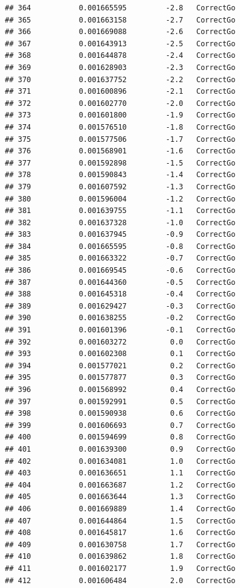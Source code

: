 \documentclass[
]{article}
\begin{document}
\begin{verbatim}
## 364           0.001665595         -2.8   CorrectGo
## 365           0.001663158         -2.7   CorrectGo
## 366           0.001669088         -2.6   CorrectGo
## 367           0.001643913         -2.5   CorrectGo
## 368           0.001644878         -2.4   CorrectGo
## 369           0.001628903         -2.3   CorrectGo
## 370           0.001637752         -2.2   CorrectGo
## 371           0.001600896         -2.1   CorrectGo
## 372           0.001602770         -2.0   CorrectGo
## 373           0.001601800         -1.9   CorrectGo
## 374           0.001576510         -1.8   CorrectGo
## 375           0.001577506         -1.7   CorrectGo
## 376           0.001568901         -1.6   CorrectGo
## 377           0.001592898         -1.5   CorrectGo
## 378           0.001590843         -1.4   CorrectGo
## 379           0.001607592         -1.3   CorrectGo
## 380           0.001596004         -1.2   CorrectGo
## 381           0.001639755         -1.1   CorrectGo
## 382           0.001637328         -1.0   CorrectGo
## 383           0.001637945         -0.9   CorrectGo
## 384           0.001665595         -0.8   CorrectGo
## 385           0.001663322         -0.7   CorrectGo
## 386           0.001669545         -0.6   CorrectGo
## 387           0.001644360         -0.5   CorrectGo
## 388           0.001645318         -0.4   CorrectGo
## 389           0.001629427         -0.3   CorrectGo
## 390           0.001638255         -0.2   CorrectGo
## 391           0.001601396         -0.1   CorrectGo
## 392           0.001603272          0.0   CorrectGo
## 393           0.001602308          0.1   CorrectGo
## 394           0.001577021          0.2   CorrectGo
## 395           0.001577877          0.3   CorrectGo
## 396           0.001568992          0.4   CorrectGo
## 397           0.001592991          0.5   CorrectGo
## 398           0.001590938          0.6   CorrectGo
## 399           0.001606693          0.7   CorrectGo
## 400           0.001594699          0.8   CorrectGo
## 401           0.001639300          0.9   CorrectGo
## 402           0.001634081          1.0   CorrectGo
## 403           0.001636651          1.1   CorrectGo
## 404           0.001663687          1.2   CorrectGo
## 405           0.001663644          1.3   CorrectGo
## 406           0.001669889          1.4   CorrectGo
## 407           0.001644864          1.5   CorrectGo
## 408           0.001645817          1.6   CorrectGo
## 409           0.001630758          1.7   CorrectGo
## 410           0.001639862          1.8   CorrectGo
## 411           0.001602177          1.9   CorrectGo
## 412           0.001606484          2.0   CorrectGo

\end{verbatim}
\end{document}
